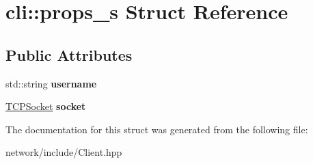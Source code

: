 \hypertarget{structcli_1_1props__s}{}\section{cli\+:\+:props\+\_\+s Struct Reference}
\label{structcli_1_1props__s}
\subsection*{Public Attributes}
\begin{DoxyCompactItemize}
\item 
\mbox{\label{structcli_1_1props__s_ab3a14790c469e94078653826c8ac41b3}} 
std\+::string {\bfseries username}
\item 
\mbox{\label{structcli_1_1props__s_a82273ac86c113554ee891c5fa4bf8243}} 
\hyperlink{class_t_c_p_socket}{T\+C\+P\+Socket} {\bfseries socket}
\end{DoxyCompactItemize}


The documentation for this struct was generated from the following file\+:\begin{DoxyCompactItemize}
\item 
network/include/Client.\+hpp\end{DoxyCompactItemize}
